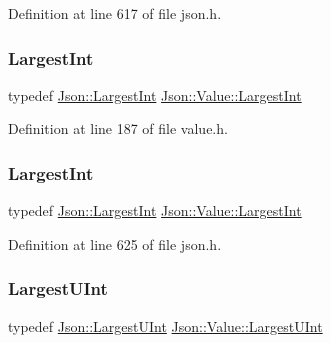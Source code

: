 Definition at line 617 of file json.\+h.

\hypertarget{class_json_1_1_value_a1cbb82642ed05109b9833e49f042ece7}{}\label{class_json_1_1_value_a1cbb82642ed05109b9833e49f042ece7} 
\subsubsection{\texorpdfstring{Largest\+Int}{LargestInt}\hspace{0.1cm}{\footnotesize\ttfamily [1/2]}}
{\footnotesize\ttfamily typedef \hyperlink{namespace_json_a218d880af853ce786cd985e82571d297}{Json\+::\+Largest\+Int} \hyperlink{class_json_1_1_value_a1cbb82642ed05109b9833e49f042ece7}{Json\+::\+Value\+::\+Largest\+Int}}



Definition at line 187 of file value.\+h.

\hypertarget{class_json_1_1_value_a1cbb82642ed05109b9833e49f042ece7}{}\label{class_json_1_1_value_a1cbb82642ed05109b9833e49f042ece7} 
\subsubsection{\texorpdfstring{Largest\+Int}{LargestInt}\hspace{0.1cm}{\footnotesize\ttfamily [2/2]}}
{\footnotesize\ttfamily typedef \hyperlink{namespace_json_a218d880af853ce786cd985e82571d297}{Json\+::\+Largest\+Int} \hyperlink{class_json_1_1_value_a1cbb82642ed05109b9833e49f042ece7}{Json\+::\+Value\+::\+Largest\+Int}}



Definition at line 625 of file json.\+h.

\hypertarget{class_json_1_1_value_a6682a3684d635e03fc06ba229fa24eec}{}\label{class_json_1_1_value_a6682a3684d635e03fc06ba229fa24eec} 
\subsubsection{\texorpdfstring{Largest\+U\+Int}{LargestUInt}\hspace{0.1cm}{\footnotesize\ttfamily [1/2]}}
{\footnotesize\ttfamily typedef \hyperlink{namespace_json_ae202ecad69725e23443f465e257456d0}{Json\+::\+Largest\+U\+Int} \hyperlink{class_json_1_1_value_a6682a3684d635e03fc06ba229fa24eec}{Json\+::\+Value\+::\+Largest\+U\+Int}}



